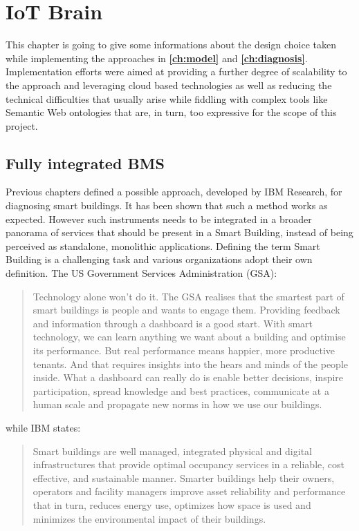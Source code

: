 \chapter{IoT Brain} \label{ch:framework}

This chapter is going to give some informations about the design choice taken while implementing the approaches in \textbf{\autoref{ch:model}} and \textbf{\autoref{ch:diagnosis}}.
Implementation efforts were aimed at providing a further degree of scalability to the approach and leveraging cloud based technologies as well as reducing the technical difficulties that usually arise while fiddling with complex tools like Semantic Web ontologies that are, in turn, too expressive for the scope of this project.

\section{Fully integrated BMS}
Previous chapters defined a possible approach, developed by IBM Research, for diagnosing smart buildings. It has been shown that such a method works as expected. However such instruments needs to be integrated in a broader panorama of services that should be present in a Smart Building, instead of being perceived as standalone, monolithic applications. Defining the term Smart Building is a challenging task and various organizations adopt their own definition.
The US Government Services Administration (GSA):
\begin{quote}
Technology alone won’t do it. The GSA realises that the smartest part of smart buildings is people and wants to engage them. Providing feedback and information through a dashboard is a good start. With smart technology, we can learn anything we want about a building and optimise its performance. But real performance means happier, more productive tenants. And that requires insights into the hears and minds of the people inside. What a dashboard can really do is enable better decisions, inspire participation, spread knowledge and best practices, communicate at a human scale and propagate new norms in how we use our buildings.
\end{quote}
while IBM states:
\begin{quote}
Smart buildings are well managed, integrated physical and digital infrastructures that provide optimal occupancy services in a reliable, cost effective, and sustainable manner. Smarter buildings help their owners, operators and facility managers improve asset reliability and performance that in turn, reduces energy use, optimizes how space is used and minimizes the environmental impact of their buildings.
\end{quote}
